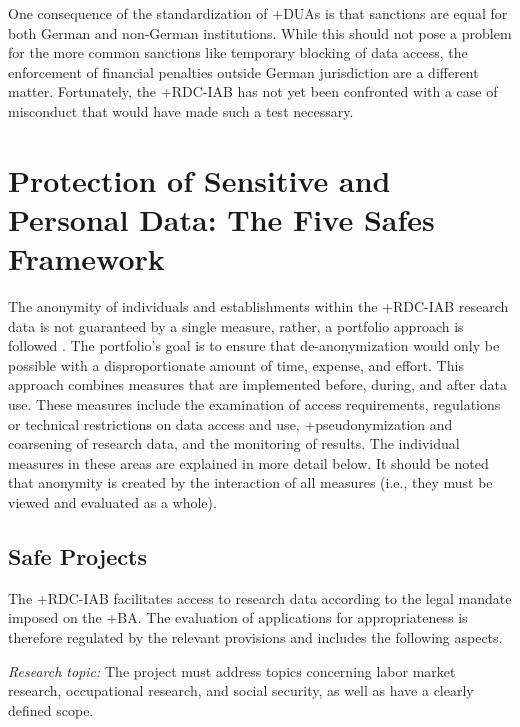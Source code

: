 \documentclass[
]{book}
\begin{document}
One consequence of the standardization of +DUA\textbar s is that sanctions are equal for both German and non-German institutions. While this should not pose a problem for the more common sanctions like temporary blocking of data access, the enforcement of financial penalties outside German jurisdiction are a different matter. Fortunately, the +RDC-IAB\textbar{} has not yet been confronted with a case of misconduct that would have made such a test necessary.

\hypertarget{protection-of-sensitive-and-personal-data-the-five-safes-framework}{%
\section{Protection of Sensitive and Personal Data: The Five Safes Framework}\label{protection-of-sensitive-and-personal-data-the-five-safes-framework}}

The anonymity of individuals and establishments within the +RDC-IAB\textbar{} research data is not guaranteed by a single measure, rather, a portfolio approach is followed \citep{hochfellner2014}. The portfolio's goal is to ensure that de-anonymization would only be possible with a disproportionate amount of time, expense, and effort. This approach combines measures that are implemented before, during, and after data use. These measures include the examination of access requirements, regulations or technical restrictions on data access and use, +pseudonymization\textbar{} and coarsening of research data, and the monitoring of results. The individual measures in these areas are explained in more detail below. It should be noted that anonymity is created by the interaction of all measures (i.e., they must be viewed and evaluated as a whole).

\hypertarget{safe-projects}{%
\subsection{Safe Projects}\label{safe-projects}}

The +RDC-IAB\textbar{} facilitates access to research data according to the legal mandate imposed on the +BA\textbar. The evaluation of applications for appropriateness is therefore regulated by the relevant provisions and includes the following aspects.

\emph{Research topic:} The project must address topics concerning labor market research, occupational research, and social security, as well as have a clearly defined scope.
\end{document}

